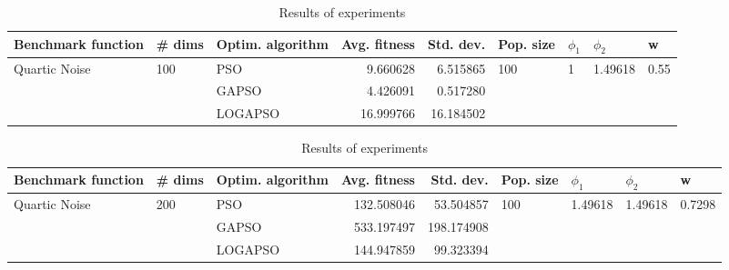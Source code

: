 \documentclass{article}
\begin{document}
\begin{table}
\centering
\caption{Results of experiments}
\begin{tabular}{lllrrllll}
\toprule
            Benchmark function &              \# dims & Optim. algorithm &  Avg. fitness &  Std. dev. &            Pop. size &         $\phi_{1}$ &               $\phi_{2}$ &                     w \\
\midrule
\multirow{3}{*}{Quartic Noise} & \multirow{3}{*}{100} &              PSO &      9.660628 &   6.515865 & \multirow{3}{*}{100} & \multirow{3}{*}{1} & \multirow{3}{*}{1.49618} & \multirow{3}{*}{0.55} \\
                               &                      &            GAPSO &      4.426091 &   0.517280 &                      &                    &                          &                       \\
                               &                      &          LOGAPSO &     16.999766 &  16.184502 &                      &                    &                          &                       \\
\bottomrule
\end{tabular}
\end{table}
\begin{table}
\centering
\caption{Results of experiments}
\begin{tabular}{lllrrllll}
\toprule
            Benchmark function &              \# dims & Optim. algorithm &  Avg. fitness &  Std. dev. &            Pop. size &               $\phi_{1}$ &               $\phi_{2}$ &                       w \\
\midrule
\multirow{3}{*}{Quartic Noise} & \multirow{3}{*}{200} &              PSO &    132.508046 &  53.504857 & \multirow{3}{*}{100} & \multirow{3}{*}{1.49618} & \multirow{3}{*}{1.49618} & \multirow{3}{*}{0.7298} \\
                               &                      &            GAPSO &    533.197497 & 198.174908 &                      &                          &                          &                         \\
                               &                      &          LOGAPSO &    144.947859 &  99.323394 &                      &                          &                          &                         \\
\bottomrule
\end{tabular}
\end{table}
\end{document}
